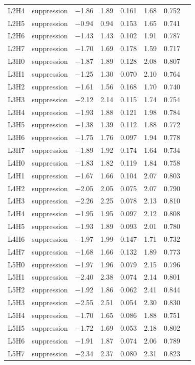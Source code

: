 \begin{table}[h]
\begin{tabular}{llrrrrrr}
L2H4 & suppression   & $-$1.86 & 1.89 & 0.161 & 1.68 & 0.752 \\
L2H5 & suppression   & $-$0.94 & 0.94 & 0.153 & 1.65 & 0.741 \\
L2H6 & suppression   & $-$1.43 & 1.43 & 0.102 & 1.91 & 0.787 \\
L2H7 & suppression   & $-$1.70 & 1.69 & 0.178 & 1.59 & 0.717 \\
\midrule
L3H0 & suppression   & $-$1.87 & 1.89 & 0.128 & 2.08 & 0.807 \\
L3H1 & suppression   & $-$1.25 & 1.30 & 0.070 & 2.10 & 0.764 \\
L3H2 & suppression   & $-$1.61 & 1.56 & 0.168 & 1.70 & 0.740 \\
L3H3 & suppression   & $-$2.12 & 2.14 & 0.115 & 1.74 & 0.754 \\
L3H4 & suppression   & $-$1.93 & 1.88 & 0.121 & 1.98 & 0.784 \\
L3H5 & suppression   & $-$1.38 & 1.39 & 0.112 & 1.88 & 0.772 \\
L3H6 & suppression   & $-$1.75 & 1.76 & 0.097 & 1.94 & 0.778 \\
L3H7 & suppression   & $-$1.89 & 1.92 & 0.174 & 1.64 & 0.734 \\
\midrule
L4H0 & suppression   & $-$1.83 & 1.82 & 0.119 & 1.84 & 0.758 \\
L4H1 & suppression   & $-$1.67 & 1.66 & 0.104 & 2.07 & 0.803 \\
L4H2 & suppression   & $-$2.05 & 2.05 & 0.075 & 2.07 & 0.790 \\
L4H3 & suppression   & $-$2.26 & 2.25 & 0.078 & 2.13 & 0.810 \\
L4H4 & suppression   & $-$1.95 & 1.95 & 0.097 & 2.12 & 0.808 \\
L4H5 & suppression   & $-$1.93 & 1.89 & 0.093 & 2.01 & 0.780 \\
L4H6 & suppression   & $-$1.97 & 1.99 & 0.147 & 1.71 & 0.732 \\
L4H7 & suppression   & $-$1.68 & 1.66 & 0.132 & 1.89 & 0.773 \\
\midrule
L5H0 & suppression   & $-$1.97 & 1.96 & 0.079 & 2.15 & 0.796 \\
L5H1 & suppression   & $-$2.40 & 2.38 & 0.074 & 2.14 & 0.801 \\
L5H2 & suppression   & $-$1.92 & 1.86 & 0.062 & 2.41 & 0.844 \\
L5H3 & suppression   & $-$2.55 & 2.51 & 0.054 & 2.30 & 0.830 \\
L5H4 & suppression   & $-$1.70 & 1.65 & 0.086 & 1.88 & 0.751 \\
L5H5 & suppression   & $-$1.72 & 1.69 & 0.053 & 2.18 & 0.802 \\
L5H6 & suppression   & $-$1.91 & 1.87 & 0.074 & 2.06 & 0.789 \\
L5H7 & suppression   & $-$2.34 & 2.37 & 0.080 & 2.31 & 0.823 \\
\bottomrule
\end{tabular}
\end{table}

